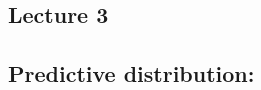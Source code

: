 \documentclass{article}\usepackage[]{graphicx}\usepackage[]{xcolor}
\begin{document}
\begin{multicols*}{2}
\section{Lecture 3}
\subsection{Predictive distribution:}
% 

\end{multicols*}
\end{document}
